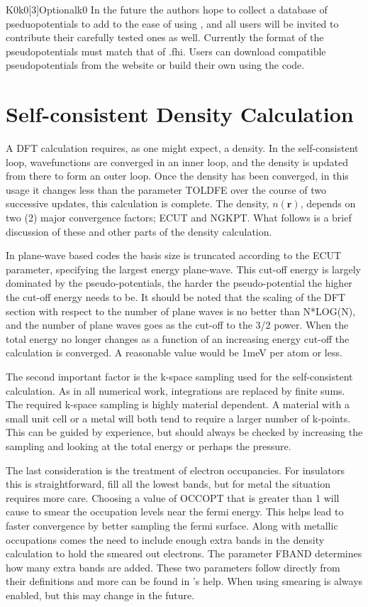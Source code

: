 \documentclass[11pt]{report}
\begin{document}
\begin{Card}{K0}{k0[3]}{Optional}{k0}
In the future the authors hope to collect a database of pseduopotentials to add to the ease of using ,
 and all users will be invited to contribute their carefully tested ones as well. Currently the format of the pseudopotentials must
 match that of  .fhi. Users can download compatible pseudopotentials from the  website \cite{abinit0} or build their own using the  code. 

\section{Self-consistent Density Calculation}
A DFT calculation requires, as one might expect, a density. In the self-consistent loop, wavefunctions are converged in an inner loop, and the density is updated from there to form an outer loop. Once the density has been converged, in this usage it changes less than the parameter TOLDFE over the course of two successive updates, this calculation is complete. The density, $n(\mathbf{r})$, depends on two (2) major convergence factors; ECUT and NGKPT. What follows is a brief discussion of these and other parts of the density calculation.

In plane-wave based codes the basis size is truncated according to the ECUT parameter, specifying the largest energy plane-wave. This cut-off energy is largely dominated by the pseudo-potentials, the harder the pseudo-potential the higher the cut-off energy needs to be. It should be noted that the scaling of the DFT section with respect to the number of plane waves is no better than N*LOG(N), and the number of plane waves goes as the cut-off to the 3/2 power. When the total energy no longer changes as a function of an increasing energy cut-off the calculation is converged. A reasonable value would be 1meV per atom or less.

The second important factor is the k-space sampling used for the self-consistent calculation. As in all numerical work, integrations are replaced by finite sums. The required k-space sampling is highly material dependent. A material with a small unit cell or a metal will both tend to require a larger number of k-points. This can be guided by experience, but should always be checked by increasing the sampling and looking at the total energy or perhaps the pressure. 

The last consideration is the treatment of electron occupancies. For insulators this is straightforward, fill all the lowest bands, but for metal the situation requires more care. Choosing a value of OCCOPT that is greater than 1 will cause  to smear the occupation levels near the fermi energy. This helps lead to faster convergence by better sampling the fermi surface. Along with metallic occupations comes the need to include enough extra bands in the density calculation to hold the smeared out electrons. The parameter FBAND determines how many extra bands are added. These two parameters follow directly from their  definitions and more can be found in 's help. When using  smearing is always enabled, but this may change in the future. 





\end{Card}
\end{document}
